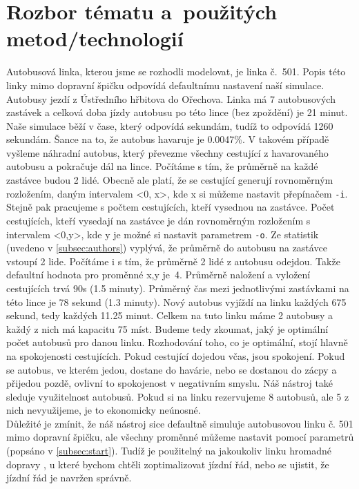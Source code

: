 \documentclass[a4paper]{article}
\begin{document}
\newpage
    \section{Rozbor tématu a~použitých metod/technologií}
    \label{sec:methods}
        Autobusová linka, kterou jsme se rozhodli modelovat, je linka č.~501. Popis této linky mimo dopravní špičku odpovídá defaultnímu nastavení naší simulace. Autobusy jezdí z Ústředního hřbitova do Ořechova. Linka má 7 autobusových zastávek a celková doba jízdy autobusu po této lince (bez zpoždění) je 21 minut. Naše simulace běží v čase, který odpovídá sekundám, tudíž to odpovídá 1260 sekundám. Šance na to, že autobus havaruje je 0.0047\%. V takovém případě vyšleme náhradní autobus, který převezme všechny cestující z havarovaného autobusu a pokračuje dál na lince. Počítáme s tím, že průměrně na každé zastávce budou 2 lidé. Obecně ale platí, že se cestující generují rovnoměrným rozložením, daným intervalem <0, x>, kde x si můžeme nastavit přepínačem \texttt{-i}. Stejně pak pracujeme s počtem cestujících, kteří vysednou na zastávce. Počet cestujících, kteří vysedají na zastávce je dán rovnoměrným rozložením s intervalem <0,y>, kde y je možné si nastavit parametrem \texttt{-o}. Ze statistik (uvedeno v \ref{subsec:authors}) vyplývá, že průměrně do autobusu na zastávce vstoupí 2 lide. Počítáme i s tím, že průměrně 2 lidé z autobusu odejdou. Takže defaultní hodnota pro proměnné x,y je~4. Průměrně naložení a vyložení cestujících trvá 90s (1.5 minuty). Průměrný čas mezi jednotlivými zastávkami na této lince je 78 sekund (1.3 minuty). Nový autobus vyjíždí na linku každých 675 sekund, tedy každých 11.25 minut. Celkem na tuto linku máme 2 autobusy a každý z nich má kapacitu 75 míst. Budeme tedy zkoumat, jaký je optimální počet autobusů pro danou linku. Rozhodování toho, co je optimální, stojí hlavně na spokojenosti cestujících. Pokud cestující dojedou včas, jsou spokojení. Pokud se autobus, ve kterém jedou, dostane do havárie, nebo se dostanou do zácpy a přijedou pozdě, ovlivní to spokojenost v negativním smyslu. Náš nástroj také sleduje využitelnost autobusů. Pokud si na linku rezervujeme 8 autobusů, ale 5 z nich nevyužijeme, je to ekonomicky neúnosné.\\
        Důležité je zmínit, že náš nástroj sice defaultně simuluje autobusovou linku č. 501 mimo dopravní špičku, ale všechny proměnné můžeme nastavit pomocí parametrů (popsáno v \ref{subsec:start}). Tudíž je použitelný na jakoukoliv linku hromadné dopravy , u které bychom chtěli zoptimalizovat jízdní řád, nebo se ujistit, že jízdní řád je navržen správně.
\end{document}
